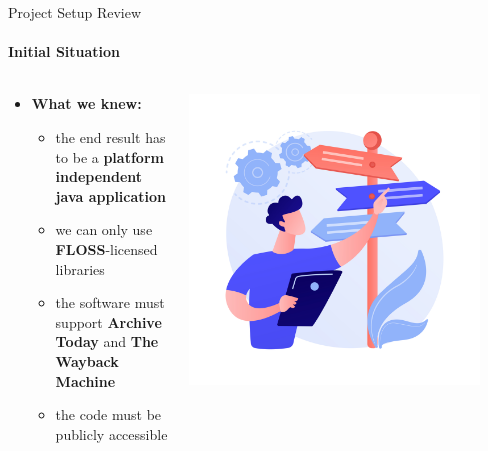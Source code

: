 \documentclass[
ngerman,%
authorontitle=true,
]{bfhbeamer}
\begin{document}
	\begin{frame}{Project Setup Review}
		\framesubtitle{Initial Situation}
		\begin{columns} %
			\begin{column}{0.7\textwidth} %
				\begin{itemize}
					\item \textbf{What we knew:}
					\begin{itemize}
						\item the end result has to be a \textbf{platform independent java application}
						\item we can only use \textbf{FLOSS}-licensed libraries 
						\item the software must support \textbf{Archive Today} and \textbf{The Wayback Machine}
						\item the code must be publicly accessible
					\end{itemize}
					
				\end{itemize}
			\end{column}
			\begin{column}{0.3\textwidth} %
				\begin{center}
					\includegraphics[width=0.9\textwidth]{pictures/final_presentation/initial_situation.jpg}
				\end{center}
			\end{column}
		\end{columns}
	\end{frame}
	
\end{document}
